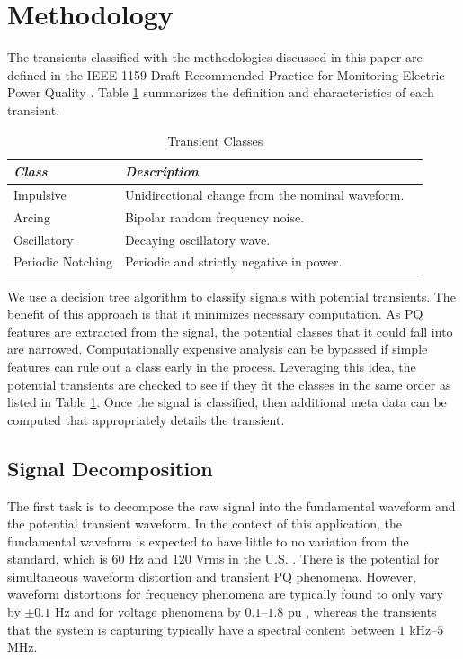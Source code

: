 \documentclass[10pt, conference, compsocconf]{IEEEtran}
\begin{document}
\section{Methodology}
\label{sec:Methodology}
The transients classified with the methodologies discussed in this paper are  defined in the IEEE 1159 Draft Recommended Practice for Monitoring Electric Power Quality \cite{IEEE:2018:1159D3}. Table \ref{TransientClasses} summarizes the definition and characteristics of each transient.

%
\begin{table}[htbp]
\caption{Transient Classes}\label{TransientClasses}
\centering%
\begin{tabular}{lll}
\hline
\textit{Class} & \textit{Description} \\
\hline
Impulsive & Unidirectional change from the nominal waveform. \\
Arcing & Bipolar random frequency noise. \\
Oscillatory & Decaying oscillatory wave. \\
Periodic Notching & Periodic and strictly negative in power. \\
\hline
\end{tabular}
\end{table}
%

We use a decision tree algorithm to classify signals with potential transients. The benefit of this approach is that it minimizes necessary computation. As PQ features are extracted from the signal, the potential classes that it could fall into are narrowed. Computationally expensive analysis can be bypassed if simple features can rule out a class early in the process. Leveraging this idea, the potential transients are checked to see if they fit the classes in the same order as listed in Table \ref{TransientClasses}. Once the signal is classified, then additional meta data can be computed that appropriately details the transient.

\subsection{Signal Decomposition}

The first task is to decompose the raw signal into the fundamental waveform and the potential transient waveform. In the context of this application, the fundamental waveform is expected to have little to no variation from the standard, which is $60$ Hz and $120$ Vrms in the U.S. \cite{ANSI:2016:C84.1-2016}. There is the potential for simultaneous waveform distortion and transient PQ phenomena. However, waveform distortions for frequency phenomena are typically found to only vary by $\pm 0.1$ Hz and for voltage phenomena by $0.1$–$1.8$ pu \cite{IEEE:2018:1159D3}, whereas the transients that the system is capturing typically have a spectral content between $1$ kHz–$5$ MHz.
\end{document}

